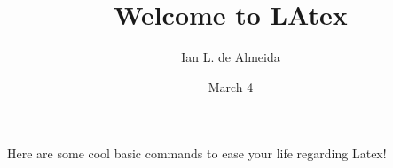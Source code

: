 \title{Welcome to LAtex}
\author{Ian L. de Almeida}
\date{March 4}

\begin{myFirstLatex}
\makelabel
Here are some cool basic commands to ease your life regarding Latex! 

\end{myFirstLatex}